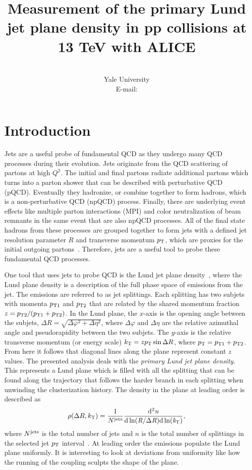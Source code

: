 \documentclass{PoS}
\title{Measurement of the primary Lund jet plane density in pp collisions at 13 TeV with ALICE}
\author{\speaker{Laura Havener (on behalf of the ALICE collaboration)}\\
        Yale University\\
        E-mail: \email{laura.havener@yale.edu}}
\begin{document}
\section{Introduction}
Jets are a useful probe of fundamental QCD as they undergo many QCD processes during their evolution. Jets originate from  the QCD scattering of partons at high $Q^{2}$. The initial and final partons radiate additional partons which turns into a parton shower that can be described with perturbative QCD (pQCD). Eventually they hadronize, or combine together to form hadrons, which is a non-perturbative QCD (npQCD) process. Finally, there are underlying event effects like multiple parton interactions (MPI) and color neutralization of beam remnants in the same event that are also npQCD processes. All of the final state hadrons from these processes are grouped together to form jets with a defined jet resolution parameter $R$ and transverse momentum $p_{\rm T}$, which are proxies for the initial outgoing partons~\cite{Salam:2010nqg}. Therefore, jets are a useful tool to probe these fundamental QCD processes.


One tool that uses jets to probe QCD is the Lund jet plane density~\cite{Dreyer:2018nbf}, where the Lund plane density is a description of the full phase space of emissions from the jet. The emissions are referred to as jet splittings. Each splitting has two subjets with momenta $p_{\rm T1}$ and $p_{\rm T2}$ that are related by the shared momentum fraction $z = p_{\rm T2}/(p_{\rm T1}+p_{\rm T2})$. In the Lund plane, the $x$-axis is the opening angle between the subjets, $\Delta{R} = \sqrt{\Delta\varphi^{2} + \Delta\eta^{2}}$, where $\Delta\varphi$ and $\Delta\eta$ are the relative azimuthal angle and pseudorapidity between the two subjets. The $y$-axis is the relative transverse momentum (or energy scale) $k_{\rm T} = zp_{\rm T}\sin{\Delta{R}}$, where $p_{\rm T} = p_{\rm T1} + p_{\rm T2}$. From here it follows that diagonal lines along the plane represent constant $z$ values. The presented analysis deals with the \emph{primary Lund jet plane density}.
This represents a Lund plane which is filled 
with all the splitting that can be found along the trajectory that follows the harder branch in each splitting
when unwinding the clusterization history. The density in the plane at leading order is described as 
\begin{equation}
\rho(\Delta{R},k_{\rm T})= \frac{1}{N^{\rm{jets}}}\frac{\rm{d}^{2}\it{n}}{\rm{d}\ln({\it{R}}/\Delta \it{R})\rm{d}\ln(\it{k_{\rm T}})},
\label{eq:Lund}
\end{equation}
where $N^{\rm{jets}}$ is the total number of jets and $n$ is the total number of splittings in the selected jet $p_{\rm T}$ interval~\cite{Dreyer:2018nbf}. At leading order the emissions populate the Lund plane uniformly. It is interesting to look at deviations from uniformity like how the running of the coupling sculpts the shape of the plane. 
\end{document}
